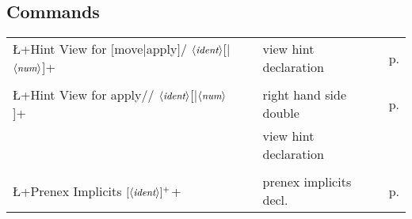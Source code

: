 \subsection*{Commands}
\begin{longtable}{lclr}
\L+Hint View for $[$move$|$apply$]$/ $\langle\mbox{\itshape\rmfamily\small ident}\rangle$[|$\langle\mbox{\itshape\rmfamily\small num}\rangle$]+ && view hint
declaration & p. \pageref{ssec:vhints}\\
\\
\L+Hint View for apply// $\langle\mbox{\itshape\rmfamily\small ident}\rangle$[|$\langle\mbox{\itshape\rmfamily\small num}\rangle$]+ && right hand side double
 & p. \pageref{ssec:vhints}\\
&&  view hint declaration &\\
\\
\L+Prenex Implicits $[\langle\mbox{\itshape\rmfamily\small ident}\rangle]^+$+ & \hspace{.6cm} & prenex implicits decl.
 & p. \pageref{ssec:parampoly}\\

\end{longtable}

